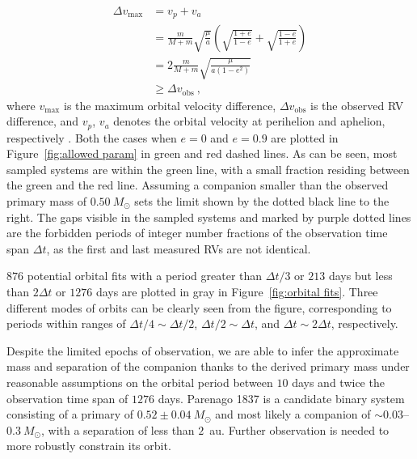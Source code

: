 \documentclass[12pt]{ucsddissertation}
\begin{document}
\begin{CJK*}{UTF8}{gbsn}
\begin{equation}
\label{eq:deltav}
\begin{split}
\Delta v_\mathrm{max}   & = v_p + v_a \\
                        & = \frac{m}{M+m}\sqrt{\frac{\mu}{a}}\left(\sqrt{\frac{1+e}{1-e}} + \sqrt{\frac{1-e}{1+e}}\right) \\
                        & = 2\frac{m}{M+m}\sqrt{\frac{\mu}{a\left(1-e^2\right)}} \\
                        & \geq\Delta v_\mathrm{obs}~,
\end{split}
\end{equation}
where $v_\mathrm{max}$ is the maximum orbital velocity difference, $\Delta v_\mathrm{obs}$ is the observed RV difference, and $v_p$, $v_a$ denotes the orbital velocity at perihelion and aphelion, respectively \citep{Murray-1999}. Both the cases when $e=0$ and $e=0.9$ are plotted in Figure~\ref{fig:allowed param} in green and red dashed lines. As can be seen, most sampled systems are within the green line, with a small fraction residing between the green and the red line. Assuming a companion smaller than the observed primary mass of $0.50~M_\odot$ sets the limit shown by the dotted black line to the right. The gaps visible in the sampled systems and marked by purple dotted lines are the forbidden periods of integer number fractions of the observation time span $\Delta t$, as the first and last measured RVs are not identical.

$876$ potential orbital fits with a period greater than $\Delta t/3$ or $213$ days but less than $2\Delta t$ or $1276$ days are plotted in gray in Figure~\ref{fig:orbital fits}. Three different modes of orbits can be clearly seen from the figure, corresponding to periods within ranges of $\Delta t/4\sim\Delta t/2$, $\Delta t/2\sim\Delta t$, and $\Delta t\sim2\Delta t$, respectively.

Despite the limited epochs of observation, we are able to infer the approximate mass and separation of the companion thanks to the derived primary mass under reasonable assumptions on the orbital period between $10$ days and twice the observation time span of $1276$ days. Parenago 1837 is a candidate binary system consisting of a primary of $0.52\pm0.04~M_\odot$ and most likely a companion of $\sim0.03$--$0.3~M_\odot$, with a separation of less than $2$~au. Further observation is needed to more robustly constrain its orbit.



\end{CJK*}
\end{document}
